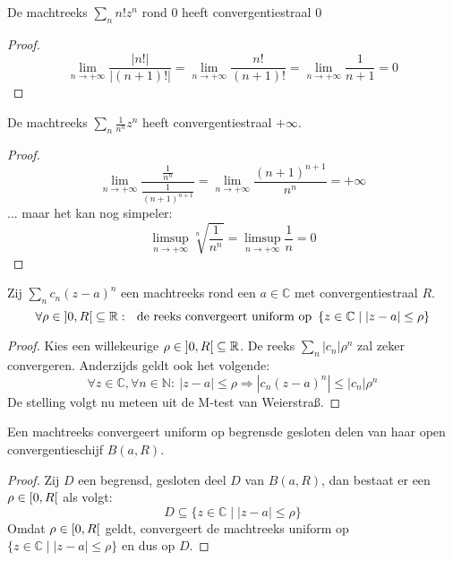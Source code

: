 \documentclass[main.tex]{subfiles}
\begin{document}
\begin{vb}
  De machtreeks $\sum_{n}n!z^{n}$ rond $0$ heeft convergentiestraal $0$
  
  \begin{proof}
    \[
    \lim_{n\rightarrow +\infty}\frac{\left|n!\right|}{\left| (n+1)!\right|}
    = \lim_{n\rightarrow +\infty}\frac{n!}{(n+1)!}
    = \lim_{n\rightarrow +\infty}\frac{1}{n+1}
    = 0
    \]
  \end{proof}
\end{vb}

\begin{vb}
  De machtreeks $\sum_{n}\frac{1}{n^{n}}z^{n}$ heeft convergentiestraal $+\infty$.
  
  \begin{proof}
    \[
    \lim_{n \rightarrow +\infty} \frac{\frac{1}{n^{n}}}{\frac{1}{(n+1)^{n+1}}}
    = \lim_{n \rightarrow +\infty}\frac{(n+1)^{n+1}}{n^{n}}
    = +\infty
    \]
    ... maar het kan nog simpeler:
    \[ \limsup_{n\rightarrow +\infty}\sqrt[n]{\frac{1}{n^{n}}} = \limsup_{n\rightarrow +\infty}\frac{1}{n} = 0 \]
  \end{proof}
\end{vb}

\begin{bst}
  \label{st:machtreeks-convergeert-uniform-op-open-convergentieschijf}
  Zij $\sum_{n}c_{n}(z-a)^{n}$ een machtreeks rond een $a\in \mathbb{C}$ met convergentiestraal $R$.
  \[ \forall \rho \in \interval[open]{0}{R} \subseteq \mathbb{R}:\ \text{ de reeks convergeert uniform op } \left\{ z \in \mathbb{C} \mid |z-a| \le \rho \right\} \]

  \begin{proof}
    Kies een willekeurige $\rho \in \interval[open]{0}{R} \subseteq \mathbb{R}$.
    De reeks $\sum_{n}|c_{n}|\rho^{n}$ zal zeker convergeren.
    Anderzijds geldt ook het volgende:
    \[ \forall z\in \mathbb{C}, \forall n\in \mathbb{N}:\ |z-a|\le \rho \Rightarrow |c_{n}(z-a)^{n}| \le |c_{n}|\rho^{n} \]
    De stelling volgt nu meteen uit de M-test van Weierstra\ss.
  \end{proof}
\end{bst}

\begin{gev}
  Een machtreeks convergeert uniform op begrensde gesloten delen van haar open convergentieschijf $B(a,R)$.
  \begin{proof}
    Zij $D$ een begrensd, gesloten deel $D$ van $B(a,R)$, dan bestaat er een $\rho \in \interval[open right]{0}{R}$ als volgt:
    \[ D \subseteq \{ z \in \mathbb{C} \mid |z-a| \le \rho \} \]
    Omdat $\rho \in \interval[open right]{0}{R}$ geldt, convergeert de machtreeks uniform op $\{ z \in \mathbb{C} \mid |z-a| \le \rho \}$ en dus op $D$.
  \end{proof}
\end{gev}
\end{document}
